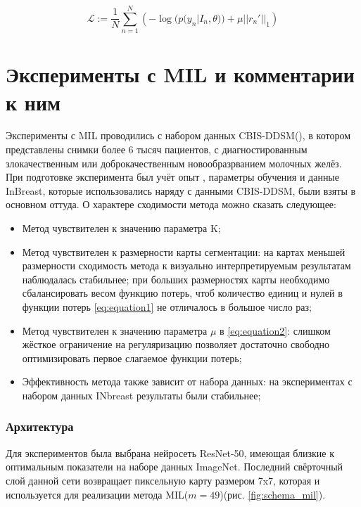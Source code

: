 \begin{equation}
  \label{eq:equation2}
  \mathcal{L} := \frac{1}{N}\sum_{n=1}^N\left(-\log(p(y_n|I_n,\theta)) + \mu||r_n'||_1\right)
\end{equation}


\section{Эксперименты с MIL и комментарии к ним}


Эксперименты с MIL проводились с набором данных CBIS-DDSM(\cite{lee_curated_2017}), в котором представлены снимки более 6 тысяч пациентов, с диагностированным  злокачественным или доброкачественным новообразрванием молочных желёз. При подготовке эксперимента был учёт опыт \cite{zhu_deep_2016}, параметры обучения и данные InBreast, которые использовались наряду с данными CBIS-DDSM, были взяты в основном оттуда. О характере сходимости метода можно сказать следующее:

\begin{itemize}
    \item Метод чувствителен к значению параметра K;
    \item Метод чувствителен к размерности карты сегментации: на картах меньшей размерности сходимость метода к визуально интерпретируемым результатам наблюдалась стабильнее; при больших размерностях карты необходимо сбалансировать весом  функцию потерь, чтоб количество единиц и нулей в функции потерь \ref{eq:equation1} не отличалось в большое число раз;
    \item Метод чувствителен к значению параметра $\mu$ в \ref{eq:equation2}: слишком жёсткое ограничение на регуляризацию позволяет достаточно свободно оптимизировать  первое слагаемое функции потерь;
    \item Эффективность метода также зависит от набора данных: на экспериментах с набором данных INbreast результаты были стабильнее;
\end{itemize}




\subsubsection{Архитектура}

Для экспериментов была выбрана нейросеть ResNet-50, имеющая близкие к оптимальным показатели на наборе данных ImageNet. Последний свёрточный слой данной сети возвращает пиксельную карту размером 7x7, которая и используется для реализации метода MIL($m = 49$)(рис. \ref{fig:schema_mil}). 


